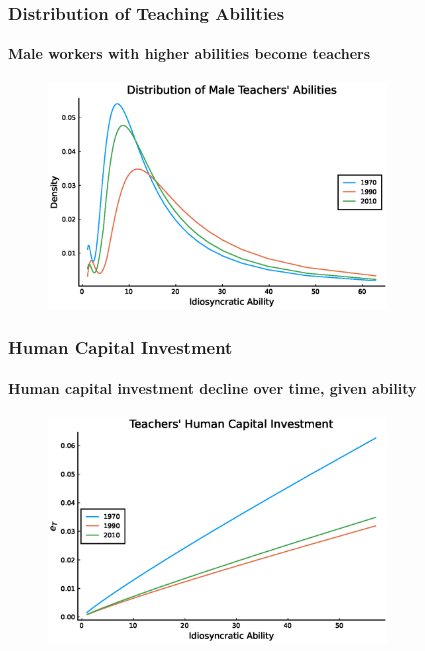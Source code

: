 \documentclass[11pt]{beamer}
\begin{document}
\begin{frame}
\frametitle{Distribution of Teaching Abilities}
\framesubtitle{Male workers with higher abilities become teachers}
\begin{figure}
 		\begin{center}
\includegraphics[width=0.8\textwidth]{fT_men_steadystate.eps}
 			\label{ }
 		\end{center}
 	\end{figure}
\end{frame}


\begin{frame}
\frametitle{Human Capital Investment}
\framesubtitle{Human capital investment decline over time, given ability}
\begin{figure}
 		\begin{center}
 			\includegraphics[width=0.8\textwidth]{eT_steadystate.eps}
 			\label{ }
 		\end{center}
 	\end{figure}
\end{frame}
\end{document}
